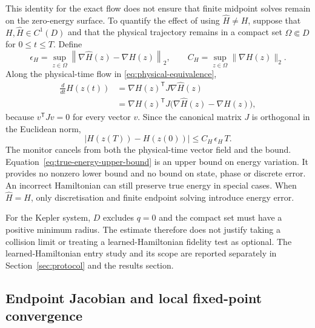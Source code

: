 \documentclass[final,3p,times]{elsarticle}
\begin{document}
This identity for the exact flow does not ensure that finite midpoint
solves remain on the zero-energy surface. To quantify the effect of using $\widehat H\ne H$, suppose that $H,\widehat H\in
C^1(D)$ and that the physical trajectory remains in a compact set
$\Omega\Subset D$ for $0\le t\le T$. Define
\begin{equation}
 \epsilon_H=\sup_{z\in\Omega}
       \left\|\nabla\widehat H(z)-\nabla H(z)\right\|_2,
 \qquad
 C_H=\sup_{z\in\Omega}\|\nabla H(z)\|_2.
 \label{eq:hamiltonian-gradient-error}
\end{equation}
Along the physical-time flow in \eqref{eq:physical-equivalence},
\begin{align}
 \frac{d}{dt}H(z(t))
 &=\nabla H(z)^{\mathsf T}J\nabla\widehat H(z)\\
 &=\nabla H(z)^{\mathsf T}J
       \bigl(\nabla\widehat H(z)-\nabla H(z)\bigr),
 \label{eq:true-energy-derivative}
\end{align}
because $v^{\mathsf T}Jv=0$ for every vector $v$. Since the canonical
matrix $J$ is orthogonal in the Euclidean norm,
\begin{equation}
 \left|H(z(T))-H(z(0))\right|
 \le C_H\,\epsilon_H\,T.
 \label{eq:true-energy-upper-bound}
\end{equation}
The monitor cancels from both the physical-time vector field and the bound.
Equation~\eqref{eq:true-energy-upper-bound} is an upper bound on energy
variation. It provides no nonzero lower bound and no bound on state,
phase or discrete error. An incorrect Hamiltonian can still preserve
true energy in special cases. When $\widehat H=H$, only discretisation
and finite endpoint solving introduce energy error.

For the Kepler system, $D$ excludes $q=0$ and the compact set must have a
positive minimum radius. The estimate therefore does not justify taking a
collision limit or treating a learned-Hamiltonian fidelity test as optional.
The learned-Hamiltonian entry study and its scope are reported separately in
Section~\ref{sec:protocol} and the results section.


\subsection{Endpoint Jacobian and local fixed-point convergence}
\label{sec:endpoint-analysis}
\end{document}
